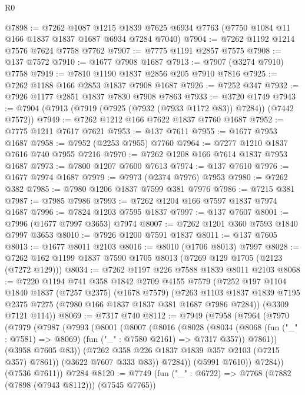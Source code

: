 \begin{lexlean}{R0}
\begin{coremodule}
@7898 := @7262
    @1087
    @1215
    @1839
    @7625
    @6934
    @7763
    (@7750 @1084 @11 @166 @1837 @1837 @1687 @6934 @7284 @7040)
@7904 := @7262 @1192 @1214 @7576 @7624 @7758 @7762
@7907 := @7775 @1191 @2857 @7575
@7908 := @137 @7572
@7910 := @1677 @7908 @1687
@7913 := @7907 (@3274 @7910) @7758
@7919 := @7810 @1190 @1837 @2856 @205 @7910 @7816
@7925 := @7262 @1188 @166 @2853 @1837 @7908 @1687
@7926 := @7252 @347
@7932 := @7926 @1177 @2851 @1837 @7830 @7908 @7863
@7933 := @3720 @1749
@7943 := @7904 (@7913 (@7919 (@7925 (@7932 (@7933 @1172 @83)) @7284)) (@7442 @7572))
@7949 := @7262 @1212 @166 @7622 @1837 @7760 @1687
@7952 := @7775 @1211 @7617 @7621
@7953 := @137 @7611
@7955 := @1677 @7953 @1687
@7958 := @7952 (@2253 @7955) @7760
@7964 := @7277 @1210 @1837 @7616 @740 @7955 @7216
@7970 := @7262 @1208 @166 @7614 @1837 @7953 @1687
@7973 := @7800 @1207 @7600 @7613
@7974 := @137 @7610
@7976 := @1677 @7974 @1687
@7979 := @7973 (@2374 @7976) @7953
@7980 := @7262 @382
@7985 := @7980 @1206 @1837 @7599 @381 @7976
@7986 := @7215 @381
@7987 := @7985 @7986
@7993 := @7262 @1204 @166 @7597 @1837 @7974 @1687
@7996 := @7824 @1203 @7595 @1837
@7997 := @137 @7607
@8001 := @7996 (@1677 @7997 @3653) @7974
@8007 := @7262 @1201 @360 @7593 @1840 @7997 @3653
@8010 := @7926 @1200 @7591 @1837
@8011 := @137 @7605
@8013 := @1677 @8011 @2103
@8016 := @8010 (@1706 @8013) @7997
@8028 := @7262 @162 @1199 @1837 @7590 @1705 @8013 (@7269 @129 @1705 (@2123 (@7272 @129)))
@8034 := @7262 @1197 @226 @7588 @1839 @8011 @2103
@8068 := @7220
    @1194
    @741
    @358
    @1842
    @2709
    @4155
    @7579
    (@7252
      @197
      @1104
      @1840
      @1837
      (@7257 @2375)
      (@1678 @7579)
      (@7263 @1103 @1837 @1839 @7195 @2375 @7275 (@7980 @166 @1837 @1837 @381 @1687 @7986 @7284))
      (@3309 @7121 @114))
@8069 := @7317 @740
@8112 := @7949
    (@7958
      (@7964
        (@7970
          (@7979
            (@7987
              (@7993
                (@8001
                  (@8007
                    (@8016
                      (@8028
                        (@8034
                          (@8068
                            (fun ("_" : @7581) => @8069)
                            (fun ("_" : @7580 @2161) => @7317 @357))
                          @7861))
                      (@3958 @7605 @83))
                    (@7262 @358 @226 @1837 @1839 @357 @2103 (@7215 @357) @7861))
                  (@3622 @7607 @333 @83))
                @7284))
            (@5991 @7610))
          @7284))
      (@7536 @7611))
    @7284
@8120 := @7749 (fun ("_" : @6722) => @7768 (@7882 (@7898 (@7943 @8112))) (@7545 @7765))

\end{coremodule}
\end{lexlean}
